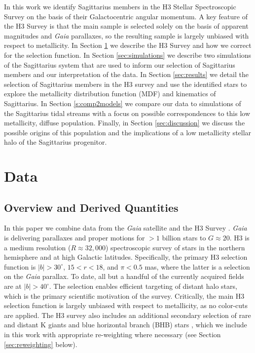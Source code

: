 \documentclass[twocolumn,tighten,twocolappendix]{aastex63}
\newcommand{\sgr}{Sagittarius}
\begin{document}
\begin{CJK*}{UTF8}{gbsn}
In this work we identify \sgr{} members in the H3 Stellar Spectroscopic Survey on the basis of their Galactocentric angular momentum.  A key feature of the H3 Survey is that the main sample is selected solely on the basis of apparent magnitudes and {\it Gaia} parallaxes, so the resulting sample is largely unbiased with respect to metallicity.  In Section \ref{sec:data} we describe the H3 Survey and how we correct for the selection function.  In Section \ref{sec:simulations} we describe two simulations of the \sgr{} system that are used to inform our selection of \sgr{} members and our interpretation of the data.  In Section \ref{sec:results} we detail the selection of \sgr{} members in the H3 survey and use the identified stars to explore the metallicity distribution function (MDF) and kinematics of \sgr{}.  In Section \ref{s:comp2models} we compare our data to simulations of the \sgr{} tidal streams with a focus on possible correspondences to this low metallicity, diffuse population.  Finally, in Section \ref{sec:discussion} we discuss the possible origins of this population and the implications of a low metallicity stellar halo of the \sgr{} progenitor.

\section{Data}
\label{sec:data}

\subsection{Overview and Derived Quantities}

In this paper we combine data from the {\it Gaia} satellite and the H3 Survey \citep{Conroy19a}.  {\it Gaia} is delivering parallaxes and proper motions for $>1$ billion stars to $G\approx20$.  H3 is a medium resolution ($R\approx32,000$) spectroscopic survey of stars in the northern hemisphere and at high Galactic latitudes.  Specifically, the primary H3 selection function is $|b|>30^\circ$, $15<r<18$, and $\pi<0.5$ mas, where the latter is a selection on the {\it Gaia} parallax. To date, all but a handful of the currently acquired fields are at $|b|>40^{\circ}$. The selection enables efficient targeting of distant halo stars, which is the primary scientific motivation of the survey.  Critically, the main H3 selection function is largely unbiased with respect to metallicity, as no color-cuts are applied.  The H3 survey also includes an additional secondary selection of rare and distant K giants and blue horizontal branch (BHB) stars \citep{Conroy19a}, which we include in this work with appropriate re-weighting where necessary (see Section \ref{sec:reweighting} below).


\end{CJK*}
\end{document}
